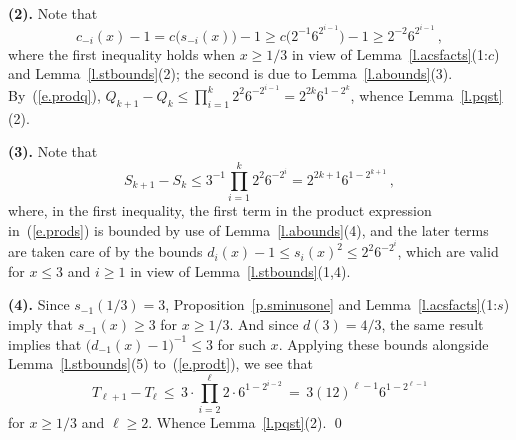 \documentclass[letterpaper,11pt,oneside,reqno]{amsbook}
\numberwithin{figure}{chapter}
\theoremstyle{definition}
\theoremstyle{definition}
\theoremstyle{definition}
\theoremstyle{definition}
\theoremstyle{definition}
\newcommand{\macsee}{c}
\newcommand{\macdee}{d}
\begin{document}
{\bf (2).}  Note that
$$
\macsee_{-i}(x) -1 = \macsee \big( s_{-i}(x)\big) -1 \geq \macsee \big( 2^{-1} 6^{2^{i-1}} \big) -1 \geq  2^{-2}6^{2^{i-1}}   \, ,
$$
where the first inequality holds when $x \geq 1/3$ in view of Lemma~\ref{l.acsfacts}(1:$c$) and Lemma~\ref{l.stbounds}(2); the second is due to Lemma~\ref{l.abounds}(3).
By~(\ref{e.prodq}), $Q_{k+1} -Q_k \leq \prod_{i=1}^k 2^2 6^{-2^{i-1}}  = 2^{2k} 6^{1 - 2^k}$, whence Lemma~\ref{l.pqst}(2).

{\bf (3).}
Note that
$$
S_{k+1} - S_k \leq  3^{-1}\prod_{i=1}^k 2^2 6^{-2^i} = 2^{2k+1} 6^{1-2^{k+1}} \, ,
$$
where, in the first inequality, the first term in the product expression in~(\ref{e.prods}) is bounded by use of Lemma~\ref{l.abounds}(4), and the later terms are taken care of by the bounds $\macdee_i(x) -1 \leq s_i(x)^2 \leq 2^2 6^{-2^i}$, which are valid for $x \leq 3$ and $i \geq 1$ in view of Lemma~\ref{l.stbounds}(1,4). 
 
 {\bf (4).} 
 Since $s_{-1}(1/3) = 3$, Proposition~\ref{p.sminusone} and Lemma~\ref{l.acsfacts}(1:$s$) imply that $s_{-1}(x) \geq 3$ for $x \geq 1/3$. And since $\macdee(3) = 4/3$, the same result implies that $\big(\macdee_{-1}(x) - 1\big)^{-1} \leq 3$ for such $x$.
 Applying these bounds alongside Lemma~\ref{l.stbounds}(5) to~(\ref{e.prodt}), we see that
 $$
  T_{\ell+1} - T_\ell \, \leq \, 3 \cdot \prod_{i=2}^\ell 2 \cdot 6^{1 - 2^{i-2}}  \, = \, 3 (12)^{\ell-1}  6^{1-2^{\ell-1}}
  $$
 for $x \geq 1/3$ and $\ell \geq 2$. Whence Lemma~\ref{l.pqst}(2). \qed
\end{document}
